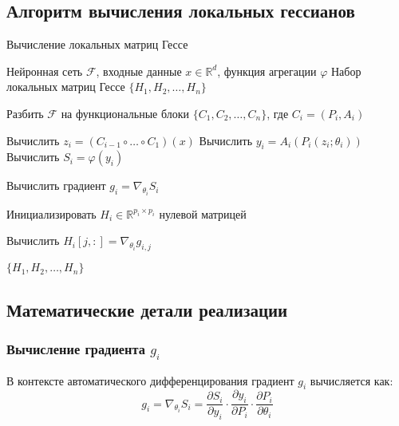 \documentclass[a4paper,12pt]{article}
\begin{document}
\newpage

\subsection{Алгоритм вычисления локальных гессианов}

\begin{algorithm}
\caption{Вычисление локальных матриц Гессе}
\begin{algorithmic}[1]
\Require Нейронная сеть $\mathcal{F}$, входные данные $x \in \mathbb{R}^d$, функция агрегации $\varphi$
\Ensure Набор локальных матриц Гессе $\{H_1, H_2, \ldots, H_n\}$

\State Разбить $\mathcal{F}$ на функциональные блоки $\{C_1, C_2, \ldots, C_n\}$, где $C_i = (P_i, A_i)$

    \State Вычислить $z_i = (C_{i-1} \circ \ldots \circ C_1)(x)$ 
    \State Вычислить $y_i = A_i(P_i(z_i; \theta_i))$ 
    \State Вычислить $S_i = \varphi(y_i)$ 
    
    \State Вычислить градиент $g_i = \nabla_{\theta_i} S_i$
    
    \State Инициализировать $H_i \in \mathbb{R}^{p_i \times p_i}$ нулевой матрицей
    
            \State Вычислить $H_i[j,:] = \nabla_{\theta_i} g_{i,j}$
        \EndIf
    \EndFor
\EndFor

\State \Return $\{H_1, H_2, \ldots, H_n\}$
\end{algorithmic}
\end{algorithm}

\subsection{Математические детали реализации}

\subsubsection{Вычисление градиента $g_i$}
В контексте автоматического дифференцирования градиент $g_i$ вычисляется как:
\begin{equation}
    g_i = \nabla_{\theta_i} S_i = \frac{\partial S_i}{\partial y_i} \cdot \frac{\partial y_i}{\partial P_i} \cdot \frac{\partial P_i}{\partial \theta_i}
\end{equation}
\end{document}
